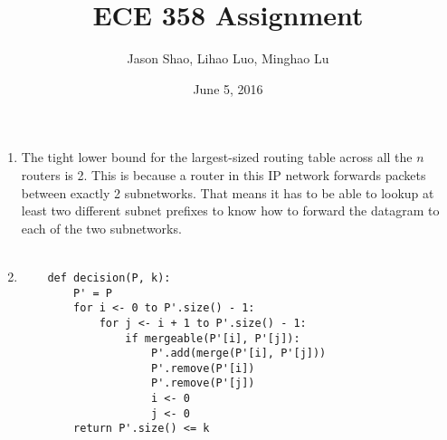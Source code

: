 \documentclass[12pt]{article}
\title{ECE 358 Assignment }
\author{Jason Shao, Lihao Luo, Minghao Lu}
\date{June 5, 2016}
\begin{document}
\maketitle
\renewcommand{\thesubsection}{Problem \arabic{subsection}}


\def\question#1{\item[\bf #1.]}
\def\part#1{\item[\bf #1)]}
\newcommand{\pc}[1]{\mbox{\textbf{#1}}} %

\begin{enumerate}
    \item The tight lower bound for the largest-sized routing table across all the $n$ routers is 2. This is because a router in this IP network forwards packets between exactly 2 subnetworks. That means it has to be able to lookup at least two different subnet prefixes to know how to forward the datagram to each of the two subnetworks. \\ \\
    \item 
    \begin{verbatim}
    def decision(P, k):
        P' = P
        for i <- 0 to P'.size() - 1:
            for j <- i + 1 to P'.size() - 1:
                if mergeable(P'[i], P'[j]):
                    P'.add(merge(P'[i], P'[j]))
                    P'.remove(P'[i])
                    P'.remove(P'[j])
                    i <- 0
                    j <- 0
        return P'.size() <= k    					
    \end{verbatim}
  
\end{enumerate}
\end{document}
